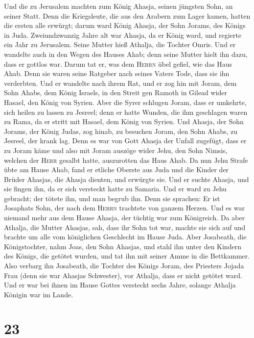 Und die zu Jerusalem machten zum König Ahasja, seinen
jüngsten Sohn, an seiner Statt. Denn die Kriegsleute, die aus den
Arabern zum Lager kamen, hatten die ersten alle erwürgt; darum ward
König Ahasja, der Sohn Jorams, des Königs in Juda. 
Zweiundzwanzig Jahre alt war Ahasja, da er König ward, und regierte ein
Jahr zu Jerusalem. Seine Mutter hieß Athalja, die Tochter Omris.
 Und er wandelte auch in den Wegen des Hauses Ahab; denn
seine Mutter hielt ihn dazu, dass er gottlos war.  Darum
tat er, was dem \textsc{Herrn} übel gefiel, wie das Haus Ahab. Denn sie
waren seine Ratgeber nach seines Vaters Tode, dass sie ihn verderbten.
 Und er wandelte nach ihrem Rat, und er zog hin mit Joram,
dem Sohn Ahabs, dem König Israels, in den Streit gen Ramoth in Gilead
wider Hasael, den König von Syrien. Aber die Syrer schlugen Joram,
 dass er umkehrte, sich heilen zu lassen zu Jesreel; denn
er hatte Wunden, die ihm geschlagen waren zu Rama, da er stritt mit
Hasael, dem König von Syrien. Und Ahasja, der Sohn Jorams, der König
Judas, zog hinab, zu besuchen Joram, den Sohn Ahabs, zu Jesreel, der
krank lag.  Denn es war von Gott Ahasja der Unfall
zugefügt, dass er zu Joram käme und also mit Joram auszöge wider Jehu,
den Sohn Nimsis, welchen der \textsc{Herr} gesalbt hatte, auszurotten
das Haus Ahab.  Da nun Jehu Strafe übte am Hause Ahab,
fand er etliche Oberste aus Juda und die Kinder der Brüder Ahasjas, die
Ahasja dienten, und erwürgte sie.  Und er suchte Ahasja,
und sie fingen ihn, da er sich versteckt hatte zu Samaria. Und er ward
zu Jehu gebracht; der tötete ihn, und man begrub ihn. Denn sie sprachen:
Er ist Josaphats Sohn, der nach dem \textsc{Herrn} trachtete von ganzem
Herzen. Und es war niemand mehr aus dem Hause Ahasja, der tüchtig war
zum Königreich.  Da aber Athalja, die Mutter Ahasjas,
sah, dass ihr Sohn tot war, machte sie sich auf und brachte um alle vom
königlichen Geschlecht im Hause Juda.  Aber Josabeath,
die Königstochter, nahm Joas, den Sohn Ahasjas, und stahl ihn unter den
Kindern des Königs, die getötet wurden, und tat ihn mit seiner Amme in
die Bettkammer. Also verbarg ihn Josabeath, die Tochter des Königs
Joram, des Priesters Jojada Frau (denn sie war Ahasjas Schwester), vor
Athalja, dass er nicht getötet ward.  Und er war bei
ihnen im Hause Gottes versteckt sechs Jahre, solange Athalja Königin war
im Lande.

\hypertarget{section-22}{%
\section{23}\label{section-22}}

